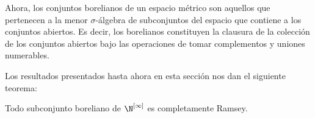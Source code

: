 Ahora, los conjuntos borelianos de un espacio métrico son aquellos que pertenecen a la menor $\sigma$-álgebra de subconjuntos del espacio que contiene a los conjuntos abiertos. Es decir, los borelianos constituyen la clausura de la colección de los conjuntos abiertos bajo las operaciones de tomar complementos y uniones numerables.

Los resultados presentados hasta ahora en esta sección nos dan el siguiente teorema:

\begin{teo}
    Todo subconjunto boreliano de $\N^{[\infty]}$ es completamente Ramsey.
\end{teo}